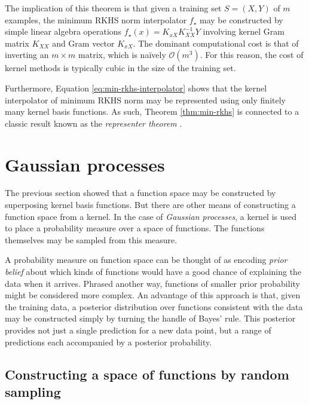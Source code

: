 \begin{refsection}
The implication of this theorem is that given a training set $S=(X,Y)$ of $m$ examples, the minimum RKHS norm interpolator $f_\star$ may be constructed by simple linear algebra operations $f_\star(x)=K_{xX} K_{XX}^{-1} Y$ involving kernel Gram matrix $K_{XX}$ and Gram vector $K_{xX}$. The dominant computational cost is that of inverting an $m \times m$ matrix, which is naïvely $\mathcal{O}(m^3)$. For this reason, the cost of kernel methods is typically cubic in the size of the training set.

Furthermore, Equation \ref{eq:min-rkhs-interpolator} shows that the kernel interpolator of minimum RKHS norm may be represented using only finitely many kernel basis functions. As such, Theorem \ref{thm:min-rkhs} is connected to a classic result known as the \textit{representer theorem} \citep{lwk}. 

\section{Gaussian processes}

The previous section showed that a function space may be constructed by superposing kernel basis functions. But there are other means of constructing a function space from a kernel. In the case of \textit{Gaussian processes}, a kernel is used to place a probability measure over a space of functions. The functions themselves may be sampled from this measure.

A probability measure on function space can be thought of as encoding \textit{prior belief} about which kinds of functions would have a good chance of explaining the data when it arrives. Phrased another way, functions of smaller prior probability might be considered more complex. An advantage of this approach is that, given the training data, a posterior distribution over functions consistent with the data may be constructed simply by turning the handle of Bayes' rule. This posterior provides not just a single prediction for a new data point, but a range of predictions each accompanied by a posterior probability.

\subsection{Constructing a space of functions by random sampling}


\end{refsection}
